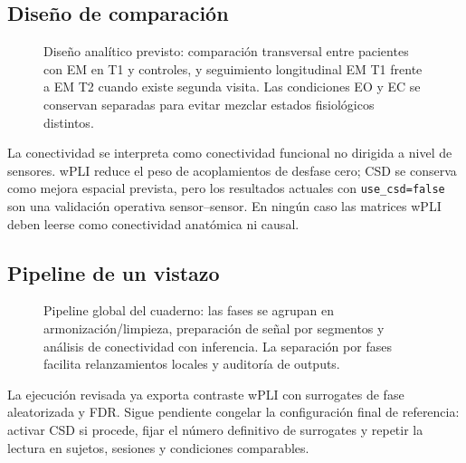 \subsection{Diseño de comparación}

\begin{fullwidth}
\begin{figure}[H]
\centering
\resizebox{0.86\fulltextwidth}{!}{\NSExperimentalDesign}
\caption{Diseño analítico previsto: comparación transversal entre pacientes con EM en T1 y controles, y seguimiento longitudinal EM T1 frente a EM T2 cuando existe segunda visita. Las condiciones EO y EC se conservan separadas para evitar mezclar estados fisiológicos distintos.}
\label{fig:generated-experimental-design}
\end{figure}
\end{fullwidth}

\begin{decisionmetodologica}
La conectividad se interpreta como conectividad funcional no dirigida a nivel de sensores. wPLI reduce el peso de acoplamientos de desfase cero; CSD se conserva como mejora espacial prevista, pero los resultados actuales con \texttt{use\_csd=false} son una validación operativa sensor--sensor. En ningún caso las matrices wPLI deben leerse como conectividad anatómica ni causal.
\end{decisionmetodologica}

\subsection{Pipeline de un vistazo}

\begin{fullwidth}
\begin{figure}[H]
\centering
\resizebox{0.98\fulltextwidth}{!}{\NSPipelineGlobal}
\caption{Pipeline global del cuaderno: las fases se agrupan en armonización/limpieza, preparación de señal por segmentos y análisis de conectividad con inferencia. La separación por fases facilita relanzamientos locales y auditoría de outputs.}
\label{fig:generated-global-pipeline}
\end{figure}
\end{fullwidth}

\begin{pendiente}
La ejecución revisada ya exporta contraste wPLI con surrogates de fase aleatorizada y FDR. Sigue pendiente congelar la configuración final de referencia: activar CSD si procede, fijar el número definitivo de surrogates y repetir la lectura en sujetos, sesiones y condiciones comparables.
\end{pendiente}
